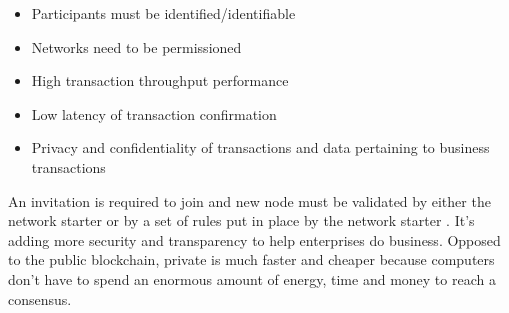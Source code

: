 \begin{description}
\begin{itemize}
    \item Participants must be identified/identifiable
    \item Networks need to be permissioned
    \item High transaction throughput performance
    \item Low latency of transaction confirmation
    \item Privacy and confidentiality of transactions and data pertaining to business transactions
\end{itemize}


An invitation is required to join and new node must be validated by either the network starter or by a set of rules put in place by the network starter \cite{private_public_blockchain}. It's adding more security and transparency to help enterprises do business. Opposed to the public blockchain, private is much faster and cheaper because computers don't  have to spend an enormous amount of energy, time and money to reach a consensus. 
\end{description}

